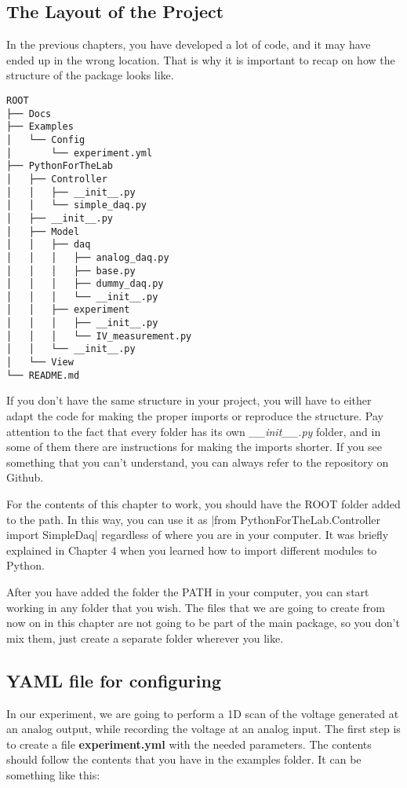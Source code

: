 \subsection{The Layout of the Project}\label{the-layout-of-theproject}
In the previous chapters, you have developed a lot of code, and it may
have ended up in the wrong location. That is why it is important to
recap on how the structure of the package looks like.

\begin{verbatim}
ROOT
├── Docs
├── Examples
│   └── Config
│       └── experiment.yml
├── PythonForTheLab
│   ├── Controller
│   │   ├── __init__.py
│   │   └── simple_daq.py
│   ├── __init__.py
│   ├── Model
│   │   ├── daq
│   │   │   ├── analog_daq.py
│   │   │   ├── base.py
│   │   │   ├── dummy_daq.py
│   │   │   └── __init__.py
│   │   ├── experiment
│   │   │   ├── __init__.py
│   │   │   └── IV_measurement.py
│   │   └── __init__.py
│   └── View
└── README.md
\end{verbatim}

If you don't have the same structure in your project, you will have to
either adapt the code for making the proper imports or reproduce the
structure. Pay attention to the fact that every folder has its own
\emph{\_\_init\_\_.py} folder, and in some of them there are
instructions for making the imports shorter. If you see something that
you can't understand, you can always refer to the repository on Github.

For the contents of this chapter to work, you should have the {ROOT}
folder added to the path. In this way, you can use it as
|from PythonForTheLab.Controller import SimpleDaq| 
regardless of where you are in your computer. It was briefly explained in Chapter 4
when you learned how to import different modules to Python.

After you have added the folder the {PATH} in your computer, you can
start working in any folder that you wish. The files that we are going
to create from now on in this chapter are not going to be part of the
main package, so you don't mix them, just create a separate folder
wherever you like.

\subsection{{YAML} file for configuring}\label{yaml-file-forconfiguring}
In our experiment, we are going to perform a 1D scan of the voltage
generated at an analog output, while recording the voltage at an analog
input. The first step is to create a file \textbf{experiment.yml} with
the needed parameters. The contents should follow the contents that you
have in the examples folder. It can be something like this:

